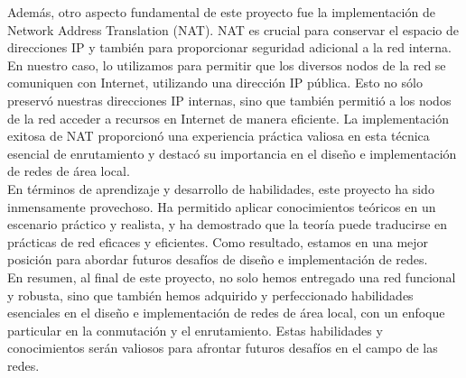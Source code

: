 Además, otro aspecto fundamental de este proyecto fue la implementación de
Network Address Translation (NAT). NAT es crucial para conservar el espacio de
direcciones IP y también para proporcionar seguridad adicional a la red interna.
En nuestro caso, lo utilizamos para permitir que los diversos nodos de la red se
comuniquen con Internet, utilizando una dirección IP pública. Esto no sólo
preservó nuestras direcciones IP internas, sino que también permitió a los
nodos de la red acceder a recursos en Internet de manera eficiente. La
implementación exitosa de NAT proporcionó una experiencia práctica valiosa en
esta técnica esencial de enrutamiento y destacó su importancia en el diseño e
implementación de redes de área local.
\\

En términos de aprendizaje y desarrollo de habilidades, este proyecto ha sido
inmensamente provechoso. Ha permitido aplicar conocimientos teóricos en un
escenario práctico y realista, y ha demostrado que la teoría puede traducirse
en prácticas de red eficaces y eficientes. Como resultado, estamos en una mejor
posición para abordar futuros desafíos de diseño e implementación de redes.
\\

En resumen, al final de este proyecto, no solo hemos entregado una red funcional
y robusta, sino que también hemos adquirido y perfeccionado habilidades
esenciales en el diseño e implementación de redes de área local, con un enfoque
particular en la conmutación y el enrutamiento. Estas habilidades y
conocimientos serán valiosos para afrontar futuros desafíos en el campo de las
redes.